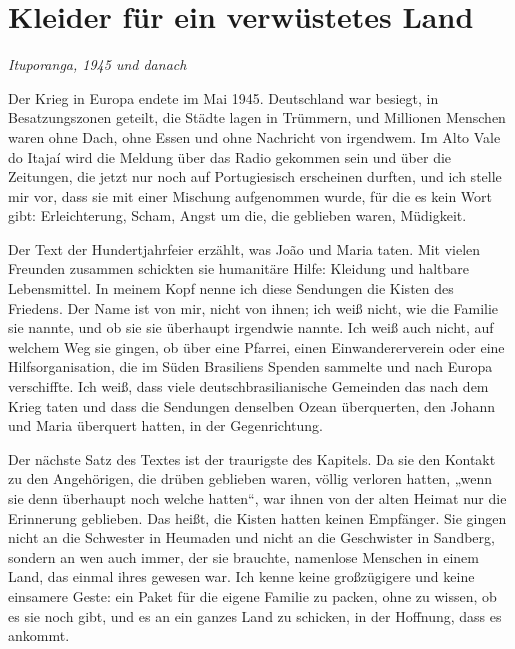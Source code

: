 \documentclass[
  ngerman,
  11pt,
  openany]{book}
\begin{document}
\section{Kleider für ein verwüstetes
Land}\label{kleider-fuxfcr-ein-verwuxfcstetes-land}

\emph{Ituporanga, 1945 und danach}

Der Krieg in Europa endete im Mai 1945. Deutschland war besiegt, in
Besatzungszonen geteilt, die Städte lagen in Trümmern, und Millionen
Menschen waren ohne Dach, ohne Essen und ohne Nachricht von irgendwem.
Im Alto Vale do Itajaí wird die Meldung über das Radio gekommen sein und
über die Zeitungen, die jetzt nur noch auf Portugiesisch erscheinen
durften, und ich stelle mir vor, dass sie mit einer Mischung aufgenommen
wurde, für die es kein Wort gibt: Erleichterung, Scham, Angst um die,
die geblieben waren, Müdigkeit.

Der Text der Hundertjahrfeier erzählt, was João und Maria taten. Mit
vielen Freunden zusammen schickten sie humanitäre Hilfe: Kleidung und
haltbare Lebensmittel. In meinem Kopf nenne ich diese Sendungen die
Kisten des Friedens. Der Name ist von mir, nicht von ihnen; ich weiß
nicht, wie die Familie sie nannte, und ob sie sie überhaupt irgendwie
nannte. Ich weiß auch nicht, auf welchem Weg sie gingen, ob über eine
Pfarrei, einen Einwandererverein oder eine Hilfsorganisation, die im
Süden Brasiliens Spenden sammelte und nach Europa verschiffte. Ich weiß,
dass viele deutschbrasilianische Gemeinden das nach dem Krieg taten und
dass die Sendungen denselben Ozean überquerten, den Johann und Maria
überquert hatten, in der Gegenrichtung.

Der nächste Satz des Textes ist der traurigste des Kapitels. Da sie den
Kontakt zu den Angehörigen, die drüben geblieben waren, völlig verloren
hatten, „wenn sie denn überhaupt noch welche hatten``, war ihnen von der
alten Heimat nur die Erinnerung geblieben. Das heißt, die Kisten hatten
keinen Empfänger. Sie gingen nicht an die Schwester in Heumaden und
nicht an die Geschwister in Sandberg, sondern an wen auch immer, der sie
brauchte, namenlose Menschen in einem Land, das einmal ihres gewesen
war. Ich kenne keine großzügigere und keine einsamere Geste: ein Paket
für die eigene Familie zu packen, ohne zu wissen, ob es sie noch gibt,
und es an ein ganzes Land zu schicken, in der Hoffnung, dass es ankommt.
\end{document}
